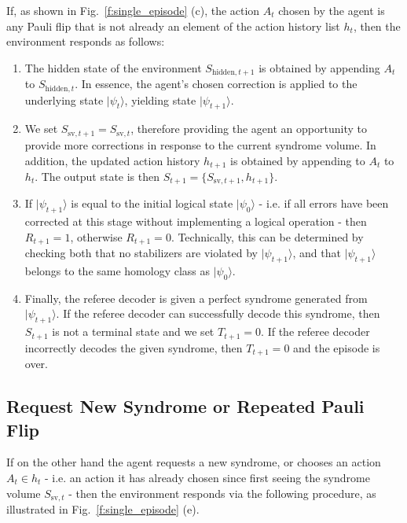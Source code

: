 \documentclass[twocolumn,preprintnumbers,amsmath,amssymb,notitlepage,nofootinbib,longbibliography,superscriptaddress,aps,pra,10pt]{revtex4-1}
\begin{document}
	If, as shown in Fig.~\ref{f:single_episode} (c), the action $A_t$ chosen by the agent is any Pauli flip that is not already an element of the action history list $h_t$, then the environment responds as follows:
	\begin{enumerate}
		\item The hidden state of the environment $S_{\mathrm{hidden},t+1}$ is obtained by appending $A_t$ to $S_{\mathrm{hidden},t}$.
		In essence, the agent's chosen correction is applied to the  underlying state $|\psi_t\rangle$, yielding state $|\psi_{t+1}\rangle$.

		\item We set $S_{\mathrm{sv},t+1} = S_{\mathrm{sv},t}$, therefore providing the agent an opportunity to provide more corrections in response to the current syndrome volume.
		In addition, the updated action history $h_{t+1}$ is obtained by appending to $A_t$ to $h_t$.
		The output state is then $S_{t+1} = \{S_{\mathrm{sv},t+1},h_{t+1}\}$.

		\item If $|\psi_{t+1}\rangle$ is equal to the initial logical state $|\psi_0\rangle$ - i.e. if all errors have been corrected at this stage without implementing a logical operation - then $R_{t+1} = 1$, otherwise $R_{t+1} = 0$.
		Technically, this can be determined by checking both that no stabilizers are violated by $|\psi_{t+1}\rangle$, and that $|\psi_{t+1}\rangle$ belongs to the same homology class as $|\psi_0\rangle$.

		\item Finally, the referee decoder is given a perfect syndrome generated from $|\psi_{t+1}\rangle$.
		If the referee decoder can successfully decode this syndrome, then $S_{t+1}$ is not a terminal state and we set $T_{t+1} = 0$.
		If the referee decoder incorrectly decodes the given syndrome, then $T_{t+1} = 0$ and the episode is over.
	\end{enumerate}

	\subsection{Request New Syndrome or Repeated Pauli Flip}

	If on the other hand the agent requests a new syndrome, or chooses an action $A_t \in h_t$ - i.e. an action it has already chosen since first seeing the syndrome volume $S_{\mathrm{sv},t}$ - then the environment responds via the following procedure, as illustrated in Fig.~\ref{f:single_episode} (e).
\end{document}
